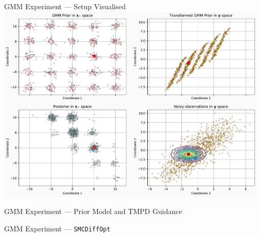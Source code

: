 \documentclass{beamer}
\begin{document}
    \begin{frame}{GMM Experiment --- Setup Visualised}
        \centering
        \includegraphics[width=0.98\textwidth]{assets/gmm-measurement-system.pdf}
    \end{frame}

    \begin{frame}{GMM Experiment --- Prior Model and TMPD Guidance}
        \centering
    \end{frame}

    \begin{frame}{GMM Experiment --- \texttt{SMCDiffOpt}}
        \centering
    \end{frame}
\end{document}
